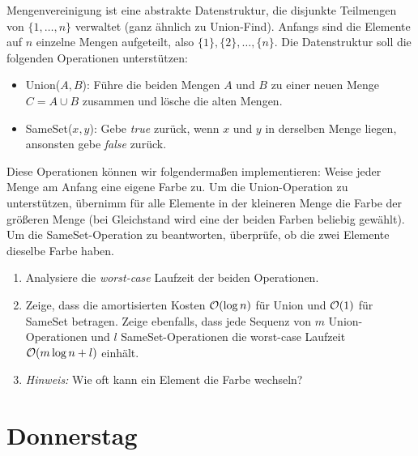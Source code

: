 \documentclass{uebung_cs}
\begin{document}
\begin{aufgabe}[Mengenvereinigung]
	Mengenvereinigung ist eine abstrakte Datenstruktur, die disjunkte Teilmengen von $\{1,\dots,n\}$ verwaltet (ganz ähnlich zu Union-Find).
	Anfangs sind die Elemente auf $n$ einzelne Mengen aufgeteilt, also $\{1\}, \{2\}, \dots,\{n\}$.
	Die Datenstruktur soll die folgenden Operationen unterstützen:
	\begin{itemize}
		\item Union($A,B$): Führe die beiden Mengen $A$ und $B$ zu einer neuen Menge $C = A \cup B$ zusammen und lösche die alten Mengen.
		\item SameSet($x,y$): Gebe \textit{true} zurück, wenn $x$ und $y$ in derselben Menge liegen, ansonsten gebe \textit{false} zurück.
	\end{itemize}
	Diese Operationen können wir folgendermaßen implementieren: Weise jeder Menge am Anfang eine eigene Farbe zu. Um die Union-Operation zu unterstützen, übernimm für alle Elemente in der kleineren Menge die Farbe der größeren Menge (bei Gleichstand wird eine der beiden Farben beliebig gewählt). Um die SameSet-Operation zu beantworten, überprüfe, ob die zwei Elemente dieselbe Farbe haben.
	
	\begin{enumerate}
		\item Analysiere die \textit{worst-case} Laufzeit der beiden Operationen.
		\item Zeige, dass die amortisierten Kosten $\mathcal{O}(\log n)$ für Union und $\mathcal{O}(1)$ für SameSet betragen. Zeige ebenfalls, dass jede Sequenz von $m$ Union-Operationen und $l$ SameSet-Operationen die worst-case Laufzeit $\mathcal{O}(m \log n + l)$ einhält.
		\item[] \textit{Hinweis:} Wie oft kann ein Element die Farbe wechseln?
	\end{enumerate}
\end{aufgabe}

\section*{Donnerstag}
\end{document}
